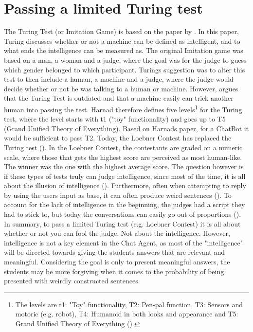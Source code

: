 \section{Passing a limited Turing test}
\label{chapter3:turing_test}
The Turing Test (or Imitation Game) is based on the paper by \citet{Turing1998}. In this paper, Turing discusses whether or not a machine can be defined as intelligent, and to 
what ends the intelligence can be measured as. The original Imitation game was based on a man, a woman and a judge, where the goal was for the judge to guess which gender belonged 
to which participant. Turings suggestion was to alter this test to then include a human, a machine and a judge, where the judge would decide whether or not he was talking to a 
human or machine. However, \citet{Harnad2000} argues that the Turing Test is outdated and that a machine easily can trick another human into passing the test. Harnad therefore 
defines five levels\footnote{The levels are t1: "Toy" functionality, T2: Pen-pal function, T3: Sensors and motoric (e.g. robot), T4: Humanoid in both looks and appearance and 
	T5: Grand Unified Theory of Everything (\citet{Harnad2000}).} for the Turing test, where the level starts with t1 ("toy" functionality) and goes up to T5 (Grand Unified Theory 
of Everything). 
Based on Harnads paper, for a ChatBot it would be sufficient to pass T2.
\vspace{0.5em}\newline
Today, the Loebner Contest has replaced the Turing test (\citet{Shieber1994,Zdenek2001}). In the Loebner Contest, the contestants are graded on a numeric scale, where those that 
gets the highest score are perceived as most human-like. The winner was the one with the highest average score. The question however is if these types of tests truly can judge 
intelligence, since most of the time, it is all about the illusion of intelligence (\citet{Livingstone2006, Shieber1994}). Furthermore, often when attempting to reply by using 
the users input as base, it can often produce weird sentences (\citet[p.~6]{Shieber1994}). To account for the lack of intelligence in the beginning, the judges had a script they 
had to stick to, but today the conversations can easily go out of proportions (\citet[p.~13]{Zdenek2001}).
\vspace{0.5em}\newline
In summary, to pass a limited Turing test (e.g. Loebner Contest) it is all about whether or not you can fool the judge. Not about the intelligence. However, intelligence is not 
a key element in the Chat Agent, as most of the "intelligence" will be directed towards giving the students answers that are relevant and meaningful. Considering the goal is 
only to present meaningful answers, the students may be more forgiving when it comes to the probability of being presented with weirdly constructed sentences.

